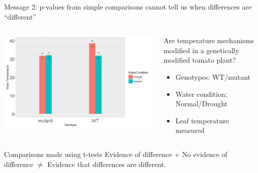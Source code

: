 \documentclass{beamer}
\begin{document}
\begin{frame}{Message 2: p-values from simple comparisons cannot tell us when differences are “different”}
 \pause
  \begin{columns}
    \begin{column}{0.5\textwidth}
	\begin{center}
	\includegraphics[width=\textwidth]{Figures/message2}
	\end{center}
    \end{column}
    
    \begin{column}{0.5\textwidth}
    \begin{block}{Are temperature mechanisms modified in a genetically modified tomato plant?}
      \begin{itemize}
	\item Genotypes: WT/mutant 
	\item Water condition: Normal/Drought
	\item Leaf temperature measured
      \end{itemize}
      \end{block}
  
    \end{column}
  \end{columns}
   
   
   \begin{alertblock}{Comparisons made using t-tests}
Evidence of difference + No evidence of difference $\neq$ Evidence that differences are different.
      \end{alertblock}
      
      
\end{frame}
\end{document}
